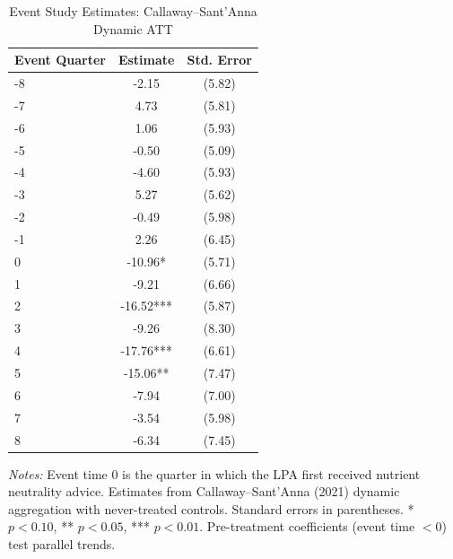 \begin{table}[H]
\centering
\caption{Event Study Estimates: Callaway--Sant'Anna Dynamic ATT}
\begin{threeparttable}
\begin{tabular}{lcc}
\toprule
Event Quarter & Estimate & Std. Error \\
\midrule
-8 & -2.15 & (5.82) \\
-7 & 4.73 & (5.81) \\
-6 & 1.06 & (5.93) \\
-5 & -0.50 & (5.09) \\
-4 & -4.60 & (5.93) \\
-3 & 5.27 & (5.62) \\
-2 & -0.49 & (5.98) \\
-1 & 2.26 & (6.45) \\
0 & -10.96* & (5.71) \\
1 & -9.21 & (6.66) \\
2 & -16.52*** & (5.87) \\
3 & -9.26 & (8.30) \\
4 & -17.76*** & (6.61) \\
5 & -15.06** & (7.47) \\
6 & -7.94 & (7.00) \\
7 & -3.54 & (5.98) \\
8 & -6.34 & (7.45) \\
\bottomrule
\end{tabular}
\begin{tablenotes}[flushleft]
\small
\item \textit{Notes:} Event time 0 is the quarter in which the LPA first received nutrient neutrality advice. Estimates from Callaway--Sant'Anna (2021) dynamic aggregation with never-treated controls. Standard errors in parentheses. * $p<0.10$, ** $p<0.05$, *** $p<0.01$. Pre-treatment coefficients (event time $<0$) test parallel trends.
\end{tablenotes}
\end{threeparttable}
\label{tab:event_study}
\end{table}
